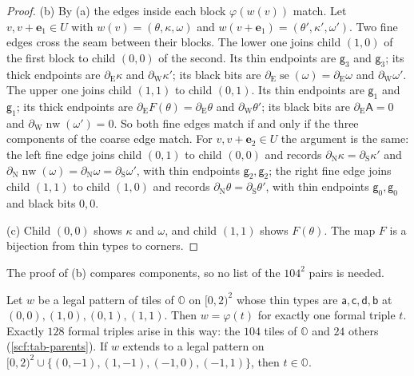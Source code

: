 \begin{proof}
(b) By (a) the edges inside each block $\varphi(w(v))$ match. Let $v,v+\mathbf e_1\in U$ with $w(v)=(\theta,\kappa,\omega)$ and $w(v+\mathbf e_1)=(\theta',\kappa',\omega')$. Two fine edges cross the seam between their blocks. The lower one joins child $(1,0)$ of the first block to child $(0,0)$ of the second. Its thin endpoints are $\mathsf g_3$ and $\mathsf g_3$; its thick endpoints are $\partial_{\mathrm E}\kappa$ and $\partial_{\mathrm W}\kappa'$; its black bits are $\partial_{\mathrm E}\operatorname{se}(\omega)=\partial_{\mathrm E}\omega$ and $\partial_{\mathrm W}\omega'$. The upper one joins child $(1,1)$ to child $(0,1)$. Its thin endpoints are $\mathsf g_1$ and $\mathsf g_1$; its thick endpoints are $\partial_{\mathrm E}F(\theta)=\partial_{\mathrm E}\theta$ and $\partial_{\mathrm W}\theta'$; its black bits are $\partial_{\mathrm E}\mathsf A=0$ and $\partial_{\mathrm W}\operatorname{nw}(\omega')=0$. So both fine edges match if and only if the three components of the coarse edge match. For $v,v+\mathbf e_2\in U$ the argument is the same: the left fine edge joins child $(0,1)$ to child $(0,0)$ and records $\partial_{\mathrm N}\kappa=\partial_{\mathrm S}\kappa'$ and $\partial_{\mathrm N}\operatorname{nw}(\omega)=\partial_{\mathrm N}\omega=\partial_{\mathrm S}\omega'$, with thin endpoints $\mathsf g_2,\mathsf g_2$; the right fine edge joins child $(1,1)$ to child $(1,0)$ and records $\partial_{\mathrm N}\theta=\partial_{\mathrm S}\theta'$, with thin endpoints $\mathsf g_0,\mathsf g_0$ and black bits $0,0$.

(c) Child $(0,0)$ shows $\kappa$ and $\omega$, and child $(1,1)$ shows $F(\theta)$. The map $F$ is a bijection from thin types to corners.
\end{proof}

The proof of (b) compares components, so no list of the $104^2$ pairs is needed.

\begin{lemma}[Parents]\label{scf:parents}
Let $w$ be a legal pattern of tiles of $\mathbb O$ on $[0,2)^2$ whose thin types are $\mathsf a,\mathsf c,\mathsf d,\mathsf b$ at $(0,0),(1,0),(0,1),(1,1)$. Then $w=\varphi(t)$ for exactly one formal triple $t$. Exactly $128$ formal triples arise in this way: the $104$ tiles of $\mathbb O$ and $24$ others (\cref{scf:tab-parents}). If $w$ extends to a legal pattern on $[0,2)^2\cup\{(0,-1),(1,-1),(-1,0),(-1,1)\}$, then $t\in\mathbb O$.
\end{lemma}

